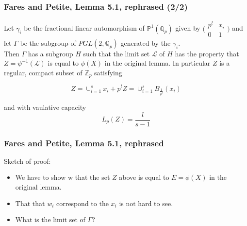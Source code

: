 \documentclass{beamer}
\theoremstyle{definition}
\begin{document}
\begin{frame}
\frametitle{Fares and Petite, Lemma 5.1, rephrased (2/2)}
 Let $\gamma_i$ be the fractional linear automorphism of $\mathbb{P}^{1}(\mathbb{Q}_p)$ given by $\bigl( \begin{smallmatrix}p^l & x_i\\ 0 & 1 \end{smallmatrix}\bigr)$ and let $\Gamma$ be the subgroup of $PGL(2,\mathbb{Q}_p)$ generated by the $\gamma_i$.\\
Then $\Gamma$ has a subgroup $H$ such that the limit set $\mathcal{L}$ of $H$ has the property that $ Z = \psi^{-1}(\mathcal{L})$ is equal to $\phi(X)$ in the original lemma. In particular $Z$ is a regular, compact subset of $\mathbb{Z}_p$ satisfying

$$ Z= \cup_{i=1}^s x_i + p^lZ =\cup_{i=1}^s B_{\frac{1}{p^l}}(x_i)$$

and with vaulative capacity \[L_p(Z) = \frac{l}{s-1}\]

\end{frame}

\begin{frame}
\frametitle{Fares and Petite, Lemma 5.1, rephrased}
Sketch of proof:
\begin{itemize}
\item We have to show w that the set $Z$ above is equal to $E=\phi(X)$ in the original lemma.
\item That that $w_i$ correspond to the $x_i$ is not hard to see.
\item What is the limit set of $\Gamma$?
\end{itemize}
\end{frame}
\end{document}
